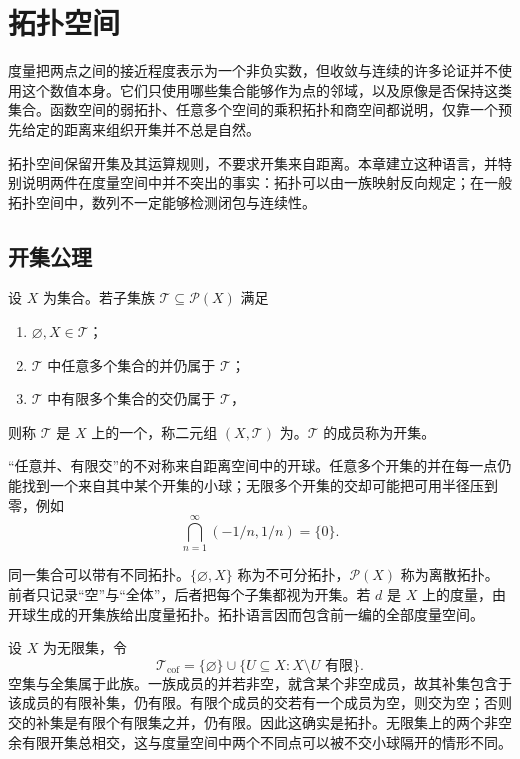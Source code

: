 \chapter{拓扑空间}
\label{chap:topological-spaces}

度量把两点之间的接近程度表示为一个非负实数，但收敛与连续的许多论证并不使用这个数值本身。它们只使用哪些集合能够作为点的邻域，以及原像是否保持这类集合。函数空间的弱拓扑、任意多个空间的乘积拓扑和商空间都说明，仅靠一个预先给定的距离来组织开集并不总是自然。

拓扑空间保留开集及其运算规则，不要求开集来自距离。本章建立这种语言，并特别说明两件在度量空间中并不突出的事实：拓扑可以由一族映射反向规定；在一般拓扑空间中，数列不一定能够检测闭包与连续性。

\section{开集公理}

\begin{definition}[拓扑与拓扑空间]
设 \(X\) 为集合。若子集族 \(\mathcal T\subseteq\mathcal P(X)\) 满足
\begin{enumerate}[label=\textup{(\roman*)}]
 \item \(\varnothing,X\in\mathcal T\)；
 \item \(\mathcal T\) 中任意多个集合的并仍属于 \(\mathcal T\)；
 \item \(\mathcal T\) 中有限多个集合的交仍属于 \(\mathcal T\)，
\end{enumerate}
则称 \(\mathcal T\) 是 \(X\) 上的一个，称二元组
\((X,\mathcal T)\) 为。\(\mathcal T\) 的成员称为开集。
\end{definition}

“任意并、有限交”的不对称来自距离空间中的开球。任意多个开集的并在每一点仍能找到一个来自其中某个开集的小球；无限多个开集的交却可能把可用半径压到零，例如
\[
 \bigcap_{n=1}^{\infty}(-1/n,1/n)=\{0\}.
\]

同一集合可以带有不同拓扑。\(\{\varnothing,X\}\) 称为不可分拓扑，\(\mathcal P(X)\) 称为离散拓扑。前者只记录“空”与“全体”，后者把每个子集都视为开集。若 \(d\) 是 \(X\) 上的度量，由开球生成的开集族给出度量拓扑。拓扑语言因而包含前一编的全部度量空间。

\begin{example}[余有限拓扑]
设 \(X\) 为无限集，令
\[
 \mathcal T_{\mathrm{cof}}
 =\{\varnothing\}\cup\{U\subseteq X:X\setminus U\text{ 有限}\}.
\]
空集与全集属于此族。一族成员的并若非空，就含某个非空成员，故其补集包含于
该成员的有限补集，仍有限。有限个成员的交若有一个成员为空，则交为空；否则
交的补集是有限个有限集之并，仍有限。因此这确实是拓扑。无限集上的两个非空
余有限开集总相交，这与度量空间中两个不同点可以被不交小球隔开的情形不同。
\end{example}


